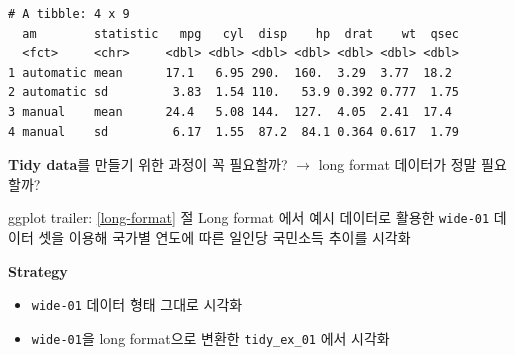 \documentclass[
  11pt,
]{krantz}
\makeatletter
\newenvironment{Shaded}{\begin{snugshade}}{\end{snugshade}}
\newcommand{\CommentTok}[1]{\textcolor[rgb]{0.37,0.37,0.37}{\textit{#1}}}
\newcommand{\DataTypeTok}[1]{\textcolor[rgb]{0.27,0.27,0.27}{#1}}
\newcommand{\KeywordTok}[1]{\textcolor[rgb]{0.27,0.27,0.27}{\textbf{#1}}}
\newcommand{\NormalTok}[1]{#1}
\newcommand{\OperatorTok}[1]{\textcolor[rgb]{0.43,0.43,0.43}{\textbf{#1}}}
\newcommand{\StringTok}[1]{\textcolor[rgb]{0.5,0.5,0.5}{#1}}
\providecommand{\tightlist}{%
  \setlength{\itemsep}{0pt}\setlength{\parskip}{0pt}}
\newenvironment{kframe}{%
\medskip{}
\setlength{\fboxsep}{.8em}
 \def\at@end@of@kframe{}%
 \ifinner\ifhmode%
  \def\at@end@of@kframe{\end{minipage}}%
  \begin{minipage}{\columnwidth}%
 \fi\fi%
 \def\FrameCommand##1{\hskip\@totalleftmargin \hskip-\fboxsep
 \colorbox{shadecolor}{##1}\hskip-\fboxsep
     \hskip-\linewidth \hskip-\@totalleftmargin \hskip\columnwidth}%
 \MakeFramed {\advance\hsize-\width
   \@totalleftmargin\z@ \linewidth\hsize
   \@setminipage}}%
 {\par\unskip\endMakeFramed%
 \at@end@of@kframe}
\renewenvironment{quote}{\begin{kframe}}{\end{kframe}}
\makeatother
\begin{document}
\begin{Shaded}
\end{Shaded}

\begin{verbatim}
# A tibble: 4 x 9
  am        statistic   mpg   cyl  disp    hp  drat    wt  qsec
  <fct>     <chr>     <dbl> <dbl> <dbl> <dbl> <dbl> <dbl> <dbl>
1 automatic mean      17.1   6.95 290.  160.  3.29  3.77  18.2 
2 automatic sd         3.83  1.54 110.   53.9 0.392 0.777  1.75
3 manual    mean      24.4   5.08 144.  127.  4.05  2.41  17.4 
4 manual    sd         6.17  1.55  87.2  84.1 0.364 0.617  1.79
\end{verbatim}

\normalsize

\textbf{Tidy data}를 만들기 위한 과정이 꼭 필요할까? \(\rightarrow\) long format 데이터가 정말 필요할까?

\begin{quote}
ggplot trailer: \ref{long-format} 절 Long format 에서 예시 데이터로 활용한 \texttt{wide-01} 데이터 셋을 이용해 국가별 연도에 따른 일인당 국민소득 추이를 시각화

\textbf{Strategy}

\begin{itemize}
\tightlist
\item
  \texttt{wide-01} 데이터 형태 그대로 시각화
\item
  \texttt{wide-01}을 long format으로 변환한 \texttt{tidy\_ex\_01} 에서 시각화
\end{itemize}
\end{quote}

\footnotesize
\end{document}
